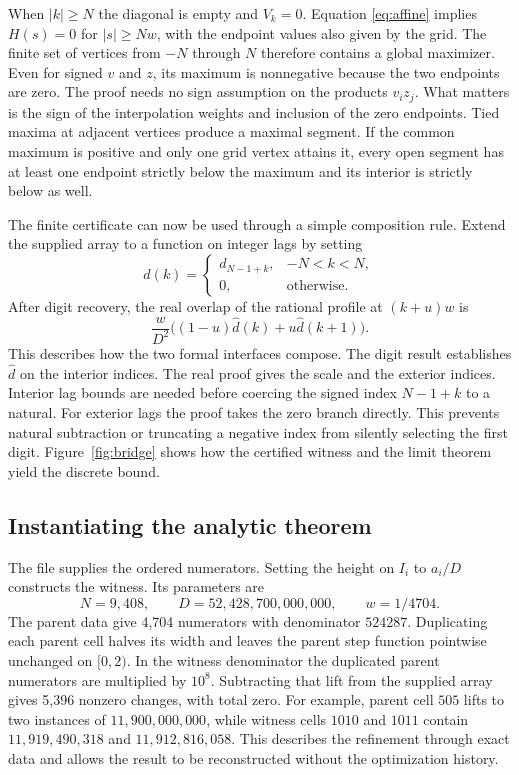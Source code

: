 \documentclass[sigplan,10pt,anonymous,review,balance=false]{acmart}
\begin{document}
When $|k|\ge N$ the diagonal is empty and $V_k=0$. Equation
\eqref{eq:affine} implies $H(s)=0$ for $|s|\ge Nw$, with
the endpoint values also given by the grid. The finite set of
vertices from $-N$ through $N$ therefore contains a global
maximizer. Even for signed $v$ and $z$, its maximum is
nonnegative because the two endpoints are zero. The proof needs no
sign assumption on the products $v_i z_j$. What matters is the sign
of the interpolation weights and inclusion of the zero endpoints.
Tied maxima at adjacent vertices produce a maximal segment. If the
common maximum is positive and only one grid vertex attains it,
every open segment has at least one endpoint strictly below the
maximum and its interior is strictly below as well.

The finite certificate can now be used through a simple
composition rule. Extend the supplied array to a function on
integer lags by setting
\[
 \widehat d(k)=
 \begin{cases}
 d_{N-1+k}, & -N<k<N,\\
 0, & \text{otherwise}.
 \end{cases}
\]
After digit recovery, the real overlap of the rational
profile at $(k+u)w$ is
\[
 \frac{w}{D^2}\big((1-u)\widehat d(k)+u\widehat d(k+1)\big).
\]
This describes how the two formal interfaces compose.
The digit result establishes $\widehat d$ on the interior
indices. The real proof gives the scale and the exterior
indices. Interior lag bounds are needed before coercing the
signed index $N-1+k$ to a natural. For exterior lags the
proof takes the zero branch directly. This prevents natural
subtraction or truncating a negative index from silently
selecting the first digit. Figure~\ref{fig:bridge} shows how
the certified witness and the limit theorem yield the discrete
bound.



\subsection{Instantiating the analytic theorem}
\label{sec:witness}

The file  supplies the ordered numerators.
Setting the height on $I_i$ to $a_i/D$ constructs the witness.
Its parameters are
\[
 N=9{,}408,\qquad D=52{,}428{,}700{,}000{,}000,
 \qquad w=1/4704.
\]
The parent data give 4,704 numerators with denominator $524287$.
Duplicating each parent cell halves its width and leaves the parent step function pointwise unchanged
on $[0,2)$. In the witness denominator the duplicated parent
numerators are multiplied by $10^8$. Subtracting that lift from
the supplied array gives 5,396 nonzero changes, with total zero.
For example, parent cell $505$ lifts to two instances of
$11{,}900{,}000{,}000$, while witness cells $1010$ and $1011$
contain $11{,}919{,}490{,}318$ and $11{,}912{,}816{,}058$.
This describes the refinement through exact data and allows the
result to be reconstructed without the optimization history.
\end{document}
